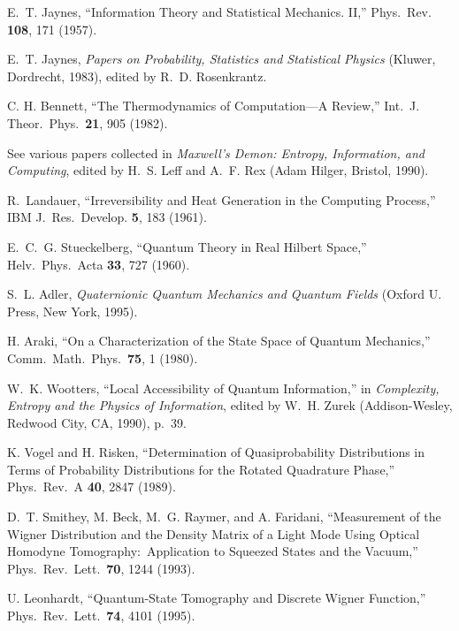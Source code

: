 \documentclass[12pt,aps,eqsecnum]{revtex4-1}
\begin{document}
\begin{thebibliography}{10}
E.~T. Jaynes, ``Information Theory and Statistical Mechanics. II,''
Phys.\ Rev. {\bf 108}, 171 (1957).

E.~T. Jaynes, {\sl Papers on Probability, Statistics and Statistical
Physics\/} (Kluwer, Dordrecht, 1983), edited by R.~D. Rosenkrantz.

C. H. Bennett, ``The Thermodynamics of Computation---A Review,''
Int.\ J. Theor.\ Phys.\ {\bf 21}, 905 (1982).

See various papers collected in {\sl Maxwell's Demon: Entropy,
Information, and Computing}, edited by H.~S. Leff and A.~F. Rex
(Adam Hilger, Bristol, 1990).

R.~Landauer, ``Irreversibility and Heat Generation in the Computing
Process,'' IBM J.\ Res.\ Develop. {\bf 5}, 183 (1961).

E.~C.~G. Stueckelberg, ``Quantum Theory in Real Hilbert Space,''
Helv.\ Phys.\ Acta {\bf 33}, 727 (1960).

S.~L. Adler, {\sl Quaternionic Quantum Mechanics and Quantum
Fields\/} (Oxford U. Press, New York, 1995).

H. Araki, ``On a Characterization of the State Space of Quantum
Mechanics,'' Comm.\ Math.\ Phys.\ {\bf 75}, 1 (1980).

W.~K. Wootters, ``Local Accessibility of Quantum Information,'' in
{\sl Complexity, Entropy and the Physics of Information}, edited by
W.~H. Zurek (Addison-Wesley, Redwood City, CA, 1990), p.~39.

K. Vogel and H. Risken, ``Determination of Quasiprobability
Distributions in Terms of Probability Distributions for the Rotated
Quadrature Phase,'' Phys.\ Rev.\ A {\bf 40}, 2847 (1989).

D.~T. Smithey, M. Beck, M.~G. Raymer, and A. Faridani, ``Measurement
of the Wigner Distribution and the Density Matrix of a Light Mode
Using Optical Homodyne Tomography:\ Application to Squeezed States
and the Vacuum,'' Phys.\ Rev.\ Lett.\ {\bf 70},  1244  (1993).

U. Leonhardt, ``Quantum-State Tomography and Discrete Wigner
Function,'' Phys.\ Rev.\ Lett.\ {\bf 74}, 4101 (1995).


\end{thebibliography}
\end{document}
